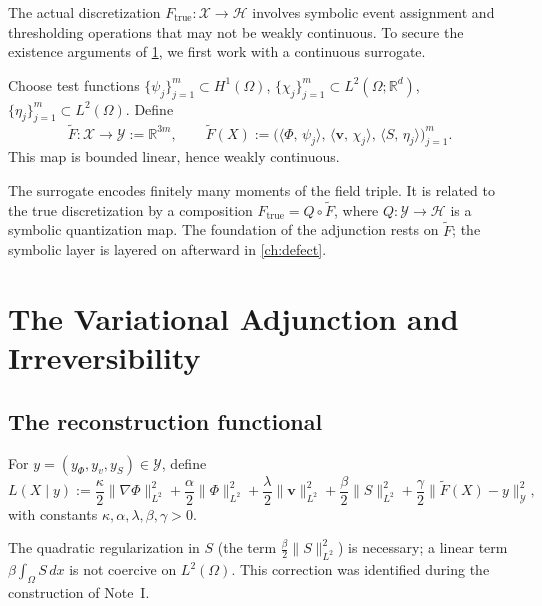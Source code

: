 \documentclass[12pt, oneside]{memoir}
\newcommand{\X}{\mathcal{X}}
\newcommand{\Hcal}{\mathcal{H}}
\newcommand{\Ft}{\widetilde{F}}
\newcommand{\nnorm}[1]{\lVert #1 \rVert}
\newcommand{\ip}[2]{\langle #1,\, #2 \rangle}
\newcommand{\bv}{\mathbf{v}}
\begin{document}
The actual discretization $F_{\mathrm{true}}: \X \to \Hcal$ involves symbolic event
assignment and thresholding operations that may not be weakly continuous.  To secure
the existence arguments of \cref{ch:adjunction}, we first work with a continuous
surrogate.

\begin{definition}
\label{def:Ftilde}
Choose test functions $\{\psi_j\}_{j=1}^m \subset H^1(\Omega)$,
$\{\chi_j\}_{j=1}^m \subset L^2(\Omega;\mathbb{R}^d)$,
$\{\eta_j\}_{j=1}^m \subset L^2(\Omega)$.  Define
\[
  \Ft : \X \to \mathcal{Y} := \mathbb{R}^{3m}, \qquad
  \Ft(X) := \bigl(
    \ip{\Phi}{\psi_j},\, \ip{\bv}{\chi_j},\, \ip{S}{\eta_j}
  \bigr)_{j=1}^m.
\]
This map is bounded linear, hence weakly continuous.
\end{definition}

The surrogate encodes finitely many moments of the field triple.  It is related to the
true discretization by a composition $F_{\mathrm{true}} = Q \circ \Ft$, where
$Q: \mathcal{Y} \to \Hcal$ is a symbolic quantization map.  The foundation of the adjunction
rests on $\Ft$; the symbolic layer is layered on afterward in \cref{ch:defect}.

\chapter{The Variational Adjunction and Irreversibility}
\label{ch:adjunction}

\section{The reconstruction functional}

\begin{definition}
\label{def:L}
For $y = (y_\Phi, y_v, y_S) \in \mathcal{Y}$, define
\begin{equation}\label{eq:L}
  L(X \mid y) :=
  \frac{\kappa}{2}\nnorm{\nabla\Phi}_{L^2}^2
  + \frac{\alpha}{2}\nnorm{\Phi}_{L^2}^2
  + \frac{\lambda}{2}\nnorm{\bv}_{L^2}^2
  + \frac{\beta}{2}\nnorm{S}_{L^2}^2
  + \frac{\gamma}{2}\nnorm{\Ft(X) - y}_{\mathcal{Y}}^2,
\end{equation}
with constants $\kappa, \alpha, \lambda, \beta, \gamma > 0$.
\end{definition}

\begin{remark}
The quadratic regularization in $S$ (the term $\frac{\beta}{2}\nnorm{S}_{L^2}^2$) is
necessary; a linear term $\beta \int_\Omega S\, dx$ is not coercive on $L^2(\Omega)$.
This correction was identified during the construction of Note~I.
\end{remark}
\end{document}
